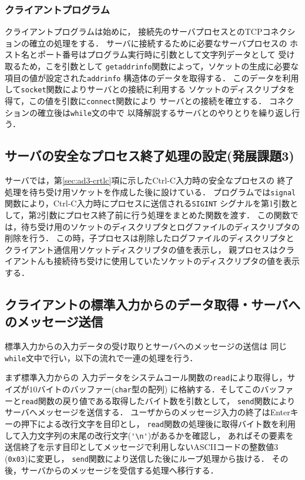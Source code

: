 \subsubsection{クライアントプログラム}
クライアントプログラムは始めに，
接続先のサーバプロセスとのTCPコネクションの確立の処理をする．
サーバに接続するために必要なサーバプロセスの
ホスト名とポート番号はプログラム実行時に引数として文字列データとして
受け取るため，こを引数として
\verb|getaddrinfo|関数によって，ソケットの生成に必要な項目の値が設定された\verb|addrinfo|
構造体のデータを取得する．
このデータを利用して\verb|socket|関数によりサーバとの接続に利用する
ソケットのディスクリプタを得て，この値を引数に\verb|connect|関数により
サーバとの接続を確立する．
コネクションの確立後は\verb|while|文の中で
以降解説するサーバとのやりとりを繰り返し行う．

\subsection{サーバの安全なプロセス終了処理の設定(発展課題3)} \label{sec:prog-ad3-original}
サーバでは，第\ref{sec:ad3-crtlc}項に示したCtrl-C入力時の安全なプロセスの
終了処理を待ち受け用ソケットを作成した後に設けている．
プログラムでは\verb|signal|関数により，Ctrl-C入力時にプロセスに送信される\verb|SIGINT|
シグナルを第1引数として，第2引数にプロセス終了前に行う処理をまとめた関数を渡す．
この関数では，待ち受け用のソケットのディスクリプタとログファイルのディスクリプタの削除を行う．
この時，子プロセスは削除したログファイルのディスクリプタとクライアント通信用ソケットディスクリプタの値を表示し，
親プロセスはクライアントんも接続待ち受けに使用していたソケットのディスクリプタの値を表示する．
\subsection{クライアントの標準入力からのデータ取得・サーバへのメッセージ送信} \label{sec:prog-client-send}
標準入力からの入力データの受け取りとサーバへのメッセージの送信は
同じ\verb|while|文中で行い，以下の流れで一連の処理を行う．

まず標準入力からの
入力データをシステムコール関数の\verb|read|により取得し，サイズが$10$バイトのバッファー(\verb|char|型の配列)
に格納する．そしてこのバッファーと\verb|read|関数の戻り値である取得したバイト数を引数として，
\verb|send|関数によりサーバへメッセージを送信する．
ユーザからのメッセージ入力の終了はEnterキーの押下による改行文字を目印とし，
\verb|read|関数の処理後に取得バイト数を利用して入力文字列の末尾の改行文字(\verb|'\n'|)があるかを確認し，
あればその要素を送信終了を示す目印としてメッセージで利用しないASCIIコードの整数値$3$(\verb|0x03|)に変更し，
\verb|send|関数により送信した後にループ処理から抜ける．
その後，サーバからのメッセージを受信する処理へ移行する．


